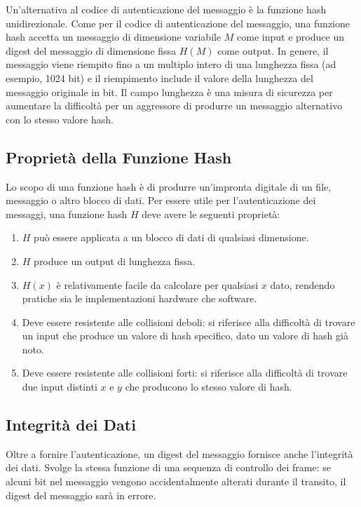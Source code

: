 Un'alternativa al codice di autenticazione del messaggio è la funzione hash unidirezionale. Come per il codice di autenticazione del messaggio, una funzione hash accetta un messaggio di dimensione variabile $M$ come input e produce un digest del messaggio di dimensione fissa $H(M)$ come output. In genere, il messaggio viene riempito fino a un multiplo intero di una lunghezza fissa (ad esempio, 1024 bit) e il riempimento include il valore della lunghezza del messaggio originale in bit. Il campo lunghezza è una misura di sicurezza per aumentare la difficoltà per un aggressore di produrre un messaggio alternativo con lo stesso valore hash.

\subsection{Proprietà della Funzione Hash}

Lo scopo di una funzione hash è di produrre un'impronta digitale di un file, messaggio o altro blocco di dati. Per essere utile per l'autenticazione dei messaggi, una funzione hash $H$ deve avere le seguenti proprietà:

\begin{enumerate}
    \item $H$ può essere applicata a un blocco di dati di qualsiasi dimensione.
    \item $H$ produce un output di lunghezza fissa.
    \item $H(x)$ è relativamente facile da calcolare per qualsiasi $x$ dato, rendendo pratiche sia le implementazioni hardware che software.
    \item Deve essere resistente alle collisioni deboli: si riferisce alla difficoltà di trovare un input che produce un valore di hash specifico, dato un valore di hash già noto.
    \item Deve essere resistente alle collisioni forti: si riferisce alla difficoltà di trovare due input distinti $x$ e $y$ che producono lo stesso valore di hash.
\end{enumerate}

\subsection{Integrità dei Dati}

Oltre a fornire l'autenticazione, un digest del messaggio fornisce anche l'integrità dei dati. Svolge la stessa funzione di una sequenza di controllo dei frame: se alcuni bit nel messaggio vengono accidentalmente alterati durante il transito, il digest del messaggio sarà in errore.

